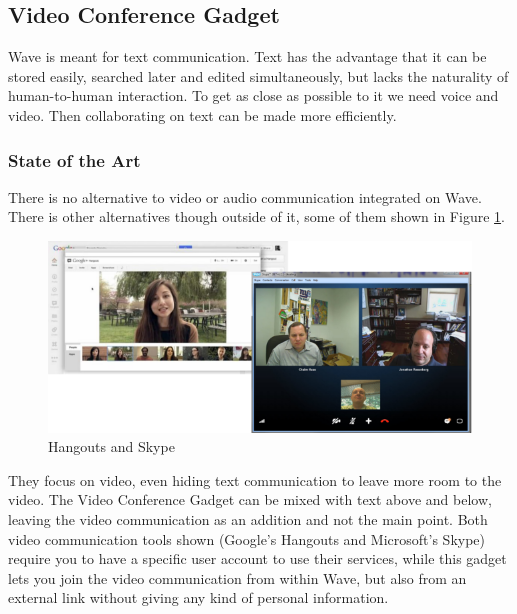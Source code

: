 \subsection{Video Conference Gadget}
Wave is meant for text communication. Text has the advantage that it can be stored easily, searched later and edited simultaneously, but lacks the naturality of human-to-human interaction. To get as close as possible to it we need voice and video. Then collaborating on text can be made more efficiently.

\subsubsection{State of the Art}
There is no alternative to video or audio communication integrated on Wave. There is other alternatives though outside of it, some of them shown in Figure \ref{fig:skype_hangouts}.
\begin{figure}[H]
  \center
    \includegraphics[keepaspectratio, scale=0.6]{Media/Captures/Soa/skype_hangouts.png}
  \caption{Hangouts and Skype}
  \label{fig:skype_hangouts}
\end{figure}
They focus on video, even hiding text communication to leave more room to the video. The Video Conference Gadget can be mixed with text above and below, leaving the video communication as an addition and not the main point. Both video communication tools shown (Google's Hangouts and Microsoft's Skype) require you to have a specific user account to use their services, while this gadget lets you join the video communication from within Wave, but also from an external link without giving any kind of personal information.

